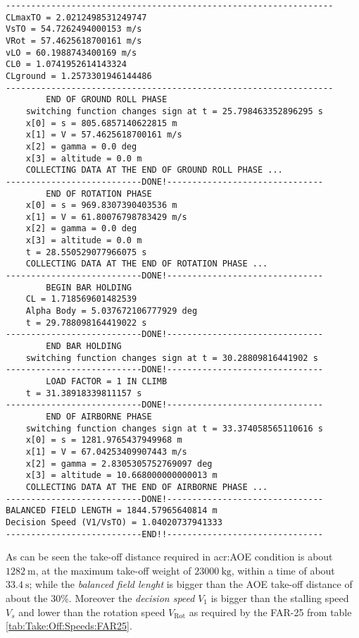 \bigskip
\begin{lstlisting}[caption={ATR-72 test results}, captionpos=b, tabsize=2]
-----------------------------------------------------------------
CLmaxTO = 2.0212498531249747
VsTO = 54.7262494000153 m/s
VRot = 57.4625618700161 m/s
vLO = 60.1988743400169 m/s
CL0 = 1.0741952614143324
CLground = 1.2573301946144486
-----------------------------------------------------------------
		END OF GROUND ROLL PHASE
	switching function changes sign at t = 25.798463352896295 s
	x[0] = s = 805.6857140622815 m
	x[1] = V = 57.4625618700161 m/s
	x[2] = gamma = 0.0 deg
	x[3] = altitude = 0.0 m
	COLLECTING DATA AT THE END OF GROUND ROLL PHASE ...
---------------------------DONE!-------------------------------
		END OF ROTATION PHASE
	x[0] = s = 969.8307390403536 m
	x[1] = V = 61.80076798783429 m/s
	x[2] = gamma = 0.0 deg
	x[3] = altitude = 0.0 m
	t = 28.550529077966075 s
	COLLECTING DATA AT THE END OF ROTATION PHASE ...
---------------------------DONE!-------------------------------
		BEGIN BAR HOLDING
	CL = 1.718569601482539
	Alpha Body = 5.037672106777929 deg
	t = 29.788098164419022 s
---------------------------DONE!-------------------------------
		END BAR HOLDING
	switching function changes sign at t = 30.28809816441902 s 
---------------------------DONE!-------------------------------
		LOAD FACTOR = 1 IN CLIMB
	t = 31.38918339811157 s
---------------------------DONE!-------------------------------
		END OF AIRBORNE PHASE
	switching function changes sign at t = 33.374058565110616 s
	x[0] = s = 1281.9765437949968 m
	x[1] = V = 67.04253409907443 m/s
	x[2] = gamma = 2.8305305752769097 deg
	x[3] = altitude = 10.668000000000013 m
	COLLECTING DATA AT THE END OF AIRBORNE PHASE ...
---------------------------DONE!-------------------------------
BALANCED FIELD LENGTH = 1844.57965640814 m
Decision Speed (V1/VsTO) = 1.04020737941333 
---------------------------END!!-------------------------------
\end{lstlisting}
%
As can be seen the take-off distance required in \gls{acr:AOE} condition is about $\SI{1282}{\meter}$, at the maximum take-off weight of $\SI{23000}{\kilogram}$, within a time of about $\SI{33.4}{\second}$; while the \emph{balanced field lenght} is bigger than the AOE take-off distance of about the 30\%.  Moreover the \emph{decision speed} $V_1$ is bigger than the stalling speed $V_s$ and lower than the rotation speed $V_{\text{Rot}}$ as required by the \gls{FAR}-25 from table \ref{tab:Take:Off:Speeds:FAR25}.
